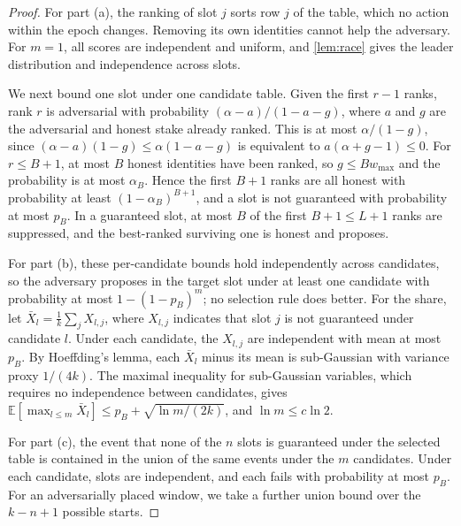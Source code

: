 \documentclass[10pt,journal,compsoc]{IEEEtran}
\theoremstyle{tplain}
\theoremstyle{tdef}
\theoremstyle{remark}
\begin{document}
\begin{proof}
For part (a), the ranking of slot $j$ sorts row $j$ of the table, which no action within the epoch changes. Removing its own identities cannot help the adversary. For $m=1$, all scores are independent and uniform, and \cref{lem:race} gives the leader distribution and independence across slots.

We next bound one slot under one candidate table. Given the first $r-1$ ranks, rank $r$ is adversarial with probability $(\alpha-a)/(1-a-g)$, where $a$ and $g$ are the adversarial and honest stake already ranked. This is at most $\alpha/(1-g)$, since $(\alpha-a)(1-g)\le\alpha(1-a-g)$ is equivalent to $a(\alpha+g-1)\le0$. For $r\le B+1$, at most $B$ honest identities have been ranked, so $g\le Bw_{\max}$ and the probability is at most $\alpha_B$. Hence the first $B+1$ ranks are all honest with probability at least $(1-\alpha_B)^{B+1}$, and a slot is not guaranteed with probability at most $p_B$. In a guaranteed slot, at most $B$ of the first $B+1\le L+1$ ranks are suppressed, and the best-ranked surviving one is honest and proposes.

For part (b), these per-candidate bounds hold independently across candidates, so the adversary proposes in the target slot under at least one candidate with probability at most $1-(1-p_B)^m$; no selection rule does better. For the share, let $\bar X_l=\frac1k\sum_j X_{l,j}$, where $X_{l,j}$ indicates that slot $j$ is not guaranteed under candidate $l$. Under each candidate, the $X_{l,j}$ are independent with mean at most $p_B$. By Hoeffding's lemma, each $\bar X_l$ minus its mean is sub-Gaussian with variance proxy $1/(4k)$. The maximal inequality for sub-Gaussian variables, which requires no independence between candidates, gives $\mathbb{E}[\max_{l\le m}\bar X_l]\le p_B+\sqrt{\ln m/(2k)}$, and $\ln m\le c\ln 2$.

For part (c), the event that none of the $n$ slots is guaranteed under the selected table is contained in the union of the same events under the $m$ candidates. Under each candidate, slots are independent, and each fails with probability at most $p_B$. For an adversarially placed window, we take a further union bound over the $k-n+1$ possible starts.
\end{proof}
\end{document}
